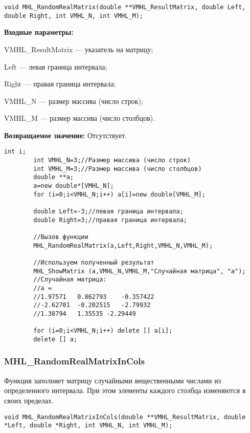 \documentclass[a4paper,12pt]{article}
\begin{document}
\begin{lstlisting}[label=code_syntax_MHL_RandomRealMatrix,caption=Синтаксис]
void MHL_RandomRealMatrix(double **VMHL_ResultMatrix, double Left, double Right, int VMHL_N, int VMHL_M);
\end{lstlisting}

\textbf{Входные параметры:}

 VMHL\_ResultMatrix --- указатель на матрицу;
 
 Left --- левая граница интервала;
 
 Right --- правая граница интервала;
 
 VMHL\_N --- размер массива (число строк);
 
 VMHL\_M --- размер массива (число столбцов).

\textbf{Возвращаемое значение:}
Отсутствует.


\begin{lstlisting}[label=code_use_MHL_RandomRealMatrix,caption=Пример использования]
        int i;
        int VMHL_N=3;//Размер массива (число строк)
        int VMHL_M=3;//Размер массива (число столбцов)
        double **a;
        a=new double*[VMHL_N];
        for (i=0;i<VMHL_N;i++) a[i]=new double[VMHL_M];

        double Left=-3;//левая граница интервала;
        double Right=3;//правая граница интервала;

        //Вызов функции
        MHL_RandomRealMatrix(a,Left,Right,VMHL_N,VMHL_M);

        //Используем полученный результат
        MHL_ShowMatrix (a,VMHL_N,VMHL_M,"Случайная матрица", "a");
        //Случайная матрица:
        //a =
        //1.97571	0.862793	-0.357422
        //-2.62701	-0.202515	-2.79932
        //1.38794	1.35535	-2.29449

        for (i=0;i<VMHL_N;i++) delete [] a[i];
        delete [] a;
\end{lstlisting}

\subsubsection{MHL\_RandomRealMatrixInCols}\label{MHL_RandomRealMatrixInCols}

Функция заполняет матрицу случайными вещественными числами из определенного интервала. При этом элементы каждого столбца изменяются в своих пределах.


\begin{lstlisting}[label=code_syntax_MHL_RandomRealMatrixInCols,caption=Синтаксис]
void MHL_RandomRealMatrixInCols(double **VMHL_ResultMatrix, double *Left, double *Right, int VMHL_N, int VMHL_M);
\end{lstlisting}
\end{document}
